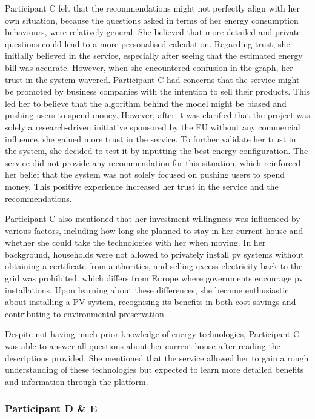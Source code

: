 Participant C felt that the recommendations might not perfectly align with her own situation,
because the questions asked in terms of her energy consumption behaviours, were relatively general. 
She believed that more detailed and private questions could lead to a more personalised calculation. 
Regarding trust, she initially believed in the service, 
especially after seeing that the estimated energy bill was accurate. 
However, when she encountered confusion in the graph, her trust in the system wavered. 
Participant C had concerns that the service might be promoted by business companies with the intention to sell their products. 
This led her to believe that the algorithm behind the model might be biased and pushing users to spend money. 
However, after it was clarified that the project was solely a research-driven initiative sponsored by the EU without any commercial influence, she gained more trust in the service.
To further validate her trust in the system, she decided to test it by inputting the best energy configuration. 
The service did not provide any recommendation for this situation, which reinforced her belief that the system was not solely focused on pushing users to spend money. 
This positive experience increased her trust in the service and the recommendations. 

Participant C also mentioned that her investment willingness was influenced by various factors, 
including how long she planned to stay in her current house and whether she could take the technologies with her when moving. 
In her background, households were not allowed to privately install \gls{pv} systems without obtaining a certificate from authorities, 
and selling excess electricity back to the grid was prohibited. 
which differs from Europe where governments encourage \gls{pv} installations. 
Upon learning about these differences, she became enthusiastic about installing a PV system, 
recognising its benefits in both cost savings and contributing to environmental preservation.

Despite not having much prior knowledge of energy technologies, 
Participant C was able to answer all questions about her current house after reading the descriptions provided. 
She mentioned that the service allowed her to gain a rough understanding of these technologies but expected to learn more detailed benefits and information through the platform.


\subsubsection{Participant D \& E}

